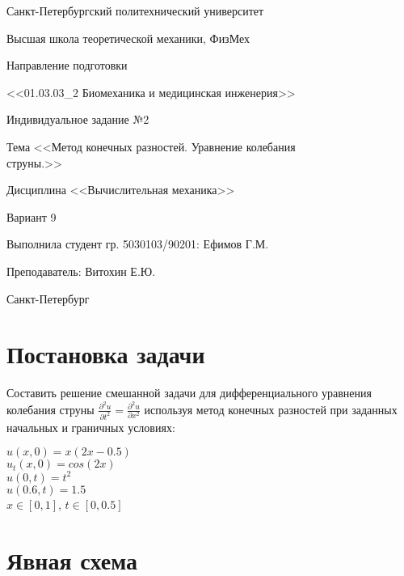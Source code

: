 \documentclass[a4paper]{article}
\begin{document}
 
\begin{titlepage}

\thispagestyle{empty}

\centerline{Санкт-Петербургский политехнический университет}
\centerline{Высшая школа теоретической механики, ФизМех}

\vfill
\centerline{Направление подготовки}
\centerline{<<01.03.03\_2 Биомеханика и медицинская инженерия>>}

\vfill

\centerline{Индивидуальное задание №2}
\begin{center}
    Тема <<Метод конечных разностей. Уравнение колебания\\ струны.>>
\end{center}    
\centerline{Дисциплина <<Вычислительная механика>>}
\centerline{Вариант 9}

\vfill

Выполнила студент гр. 5030103/90201: \hfill Ефимов Г.М. 

Преподаватель: \hfill  Витохин Е.Ю.

\vfill

\centerline{Санкт-Петербург}
\centerline{\the\year}
\clearpage
\end{titlepage}

\newpage
     
    \tableofcontents
\newpage
\section{Постановка задачи}
    Составить решение смешанной задачи для дифференциального уравнения колебания струны $\frac{\partial^{2} u}{\partial t^2} = \frac{\partial^{2} u}{\partial x^{2}}$ используя метод конечных разностей при заданных начальных и граничных условиях:\\
    \begin{center}
    $u(x,0)=x ( 2 x - 0.5 )$\\
    $u_{t}(x,0)=cos(2 x)$\\
    $u(0,t)=t^{2}$\\
    $u(0.6,t)=1.5$\\
    $x \in [0,1]$, $t \in [0,0.5]$
    \end{center}
    \newpage
\section{Явная схема}
\end{document}
